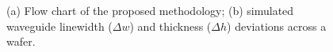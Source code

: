 \documentclass[journal]{spie}
\begin{document}
\begin{figure}[h]
    \centering
{} 
    \caption{(a) Flow chart of the proposed methodology; (b) simulated waveguide linewidth ($\Delta w$) and thickness ($\Delta h$) deviations across a wafer.} 
\end{figure}
\end{document}
